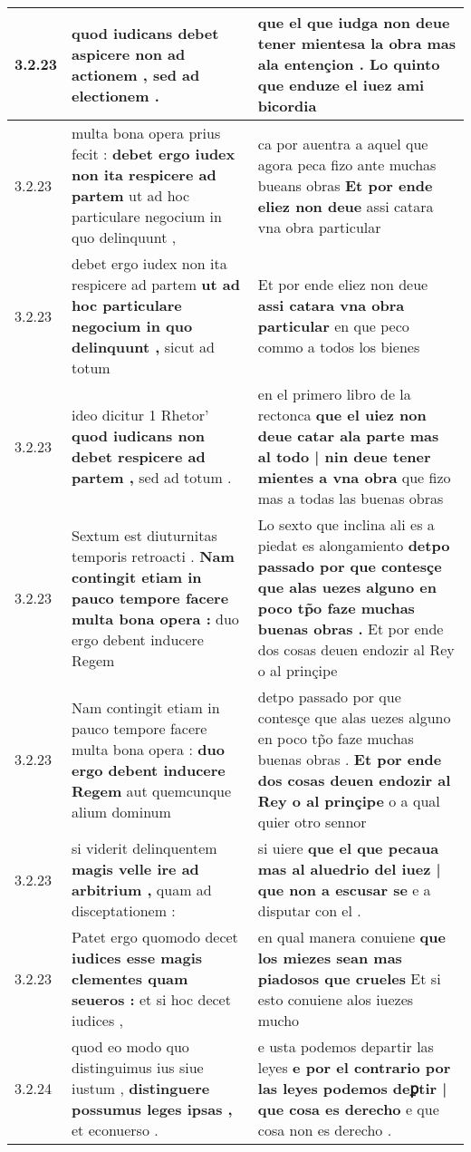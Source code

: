 \begin{tabular}{|p{1cm}|p{6.5cm}|p{6.5cm}|}
3.2.23 & quod iudicans debet \textbf{ aspicere non ad actionem , } sed ad electionem . & que el que iudga non deue tener \textbf{ mientesa la obra mas ala entençion . } Lo quinto que enduze el iuez ami bicordia \\\hline
3.2.23 & multa bona opera prius fecit : \textbf{ debet ergo iudex non ita respicere ad partem } ut ad hoc particulare negocium in quo delinquunt , & ca por auentra a aquel que agora peca fizo ante muchas bueans obras \textbf{ Et por ende eliez non deue } assi catara vna obra particular \\\hline
3.2.23 & debet ergo iudex non ita respicere ad partem \textbf{ ut ad hoc particulare negocium in quo delinquunt , } sicut ad totum & Et por ende eliez non deue \textbf{ assi catara vna obra particular } en que peco commo a todos los bienes \\\hline
3.2.23 & ideo dicitur 1 Rhetor’ \textbf{ quod iudicans non debet respicere ad partem , } sed ad totum . & en el primero libro de la rectonca \textbf{ que el uiez non deue catar ala parte mas al todo | nin deue tener mientes a vna obra } que fizo mas a todas las buenas obras \\\hline
3.2.23 & Sextum est diuturnitas temporis retroacti . \textbf{ Nam contingit etiam in pauco tempore facere multa bona opera : } duo ergo debent inducere Regem & Lo sexto que inclina ali es a piedat es alongamiento \textbf{ detpo passado por que contesçe que alas uezes alguno en poco tp̃o faze muchas buenas obras . } Et por ende dos cosas deuen endozir al Rey o al prinçipe \\\hline
3.2.23 & Nam contingit etiam in pauco tempore facere multa bona opera : \textbf{ duo ergo debent inducere Regem } aut quemcunque alium dominum & detpo passado por que contesçe que alas uezes alguno en poco tp̃o faze muchas buenas obras . \textbf{ Et por ende dos cosas deuen endozir al Rey o al prinçipe } o a qual quier otro sennor \\\hline
3.2.23 & si viderit delinquentem \textbf{ magis velle ire ad arbitrium , } quam ad disceptationem : & si uiere \textbf{ que el que pecaua mas al aluedrio del iuez | que non a escusar se } e a disputar con el . \\\hline
3.2.23 & Patet ergo quomodo decet \textbf{ iudices esse magis clementes quam seueros : } et si hoc decet iudices , & en qual manera conuiene \textbf{ que los miezes sean mas piadosos que crueles } Et si esto conuiene alos iuezes mucho \\\hline
3.2.24 & quod eo modo quo distinguimus ius siue iustum , \textbf{ distinguere possumus leges ipsas , } et econuerso . & e usta podemos departir las leyes \textbf{ e por el contrario por las leyes podemos deꝑtir | que cosa es derecho } e que cosa non es derecho . \\\hline

\end{tabular}
